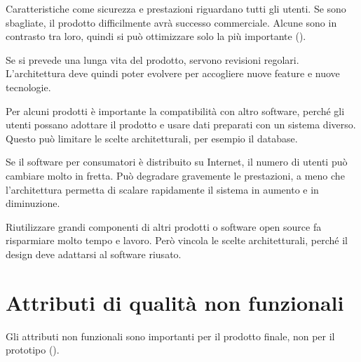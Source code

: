 \begin{description}[leftmargin=0pt, style=unboxed]
  \item[Non-functional product characteristics.] Caratteristiche come sicurezza e prestazioni riguardano tutti gli
    utenti. Se sono sbagliate, il prodotto difficilmente avrà successo commerciale. Alcune sono in contrasto tra loro,
    quindi si può ottimizzare solo la più importante ().
  \item[Product lifetime.] Se si prevede una lunga vita del prodotto, servono revisioni regolari. L'architettura deve
    quindi poter evolvere per accogliere nuove feature e nuove tecnologie.
  \item[Software compatibility.] Per alcuni prodotti è importante la compatibilità con altro software, perché gli
    utenti possano adottare il prodotto e usare dati preparati con un sistema diverso. Questo può limitare le scelte
    architetturali, per esempio il database.
  \item[Number of users.] Se il software per consumatori è distribuito su Internet, il numero di utenti può cambiare
    molto in fretta. Può degradare gravemente le prestazioni, a meno che l'architettura permetta di scalare
    rapidamente il sistema in aumento e in diminuzione.
  \item[Software reuse.] Riutilizzare grandi componenti di altri prodotti o software open source fa risparmiare
    molto tempo e lavoro. Però vincola le scelte architetturali, perché il design deve adattarsi al software riusato.
\end{description}

\section{Attributi di qualità non funzionali}
\label{sec:arch-nonfunzionali}

Gli attributi non funzionali sono importanti per il prodotto finale, non per il prototipo ().

